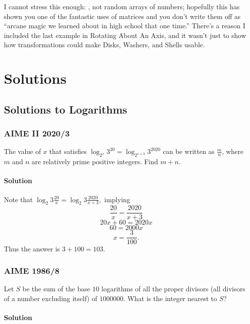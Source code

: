 \documentclass[blue,onecol]{shooting}
\begin{document}
I cannot stress this enough: , not random arrays of numbers; hopefully this has shown you one of the fantastic uses of matrices and you don't write them off as ``arcane magic we learned about in high school that one time.'' There's a reason I included the last example in Rotating About An Axis, and it wasn't just to show how transformations could make Disks, Washers, and Shells usable.


\part{Solutions}

\setcounter{chapter}{0}

\chapter{Solutions to Logarithms}














\section{AIME II 2020/3}

The value of $x$ that satisfies $\log_{2^x} 3^{20} = \log_{2^{x+3}} 3^{2020}$ can be written as $\frac{m}{n}$, where $m$ and $n$ are relatively prime positive integers. Find $m+n$.

\subsection{Solution}

Note that $\log_2{3}\frac{20}{x}=\log_2{3}\frac{2020}{x+3},$ implying
\[\frac{20}{x}=\frac{2020}{x+3}\]
\[20x+60=2020x\]
\[60=2000x\]
\[x=\frac{3}{100}.\]
Thus the answer is $3+100=103.$

\section{AIME 1986/8}

Let $S$ be the sum of the base $10$ logarithms of all the proper divisors (all divisors of a number excluding itself) of $1000000$. What is the integer nearest to $S$?

\subsection{Solution}
\end{document}
